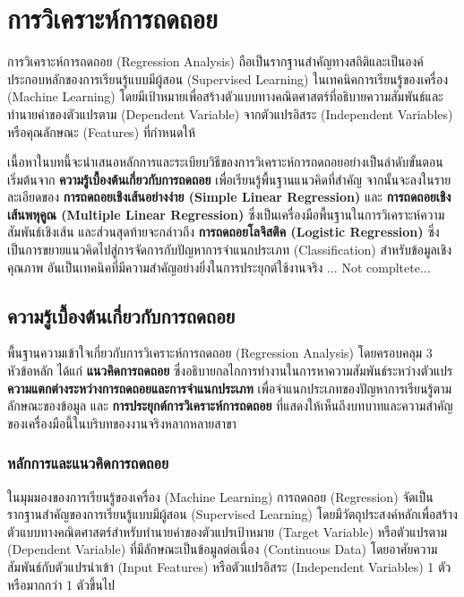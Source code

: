\chapter{การวิเคราะห์การถดถอย}

การวิเคราะห์การถดถอย (Regression Analysis) ถือเป็นรากฐานสำคัญทางสถิติและเป็นองค์ประกอบหลักของการเรียนรู้แบบมีผู้สอน (Supervised Learning) ในเทคนิคการเรียนรู้ของเครื่อง (Machine Learning) โดยมีเป้าหมายเพื่อสร้างตัวแบบทางคณิตศาสตร์ที่อธิบายความสัมพันธ์และทำนายค่าของตัวแปรตาม (Dependent Variable) จากตัวแปรอิสระ (Independent Variables) หรือคุณลักษณะ (Features) ที่กำหนดให้

เนื้อหาในบทนี้จะนำเสนอหลักการและระเบียบวิธีของการวิเคราะห์การถดถอยอย่างเป็นลำดับขั้นตอน เริ่มต้นจาก \textbf{ความรู้เบื้องต้นเกี่ยวกับการถดถอย} เพื่อเรียนรู้พื้นฐานแนวคิดที่สำคัญ จากนั้นจะลงในรายละเอียดของ \textbf{การถดถอยเชิงเส้นอย่างง่าย (Simple Linear Regression)} และ \textbf{การถดถอยเชิงเส้นพหุคูณ (Multiple Linear Regression)} ซึ่งเป็นเครื่องมือพื้นฐานในการวิเคราะห์ความสัมพันธ์เชิงเส้น และส่วนสุดท้ายจะกล่าวถึง \textbf{การถดถอยโลจิสติค (Logistic Regression)} ซึ่งเป็นการขยายแนวคิดไปสู่การจัดการกับปัญหาการจำแนกประเภท (Classification) สำหรับข้อมูลเชิงคุณภาพ อันเป็นเทคนิคที่มีความสำคัญอย่างยิ่งในการประยุกต์ใช้งานจริง ... Not compltete...

\section{ความรู้เบื้องต้นเกี่ยวกับการถดถอย}

พื้นฐานความเข้าใจเกี่ยวกับการวิเคราะห์การถดถอย (Regression Analysis) โดยครอบคลุม 3 หัวข้อหลัก ได้แก่ \textbf{แนวคิดการถดถอย} ซึ่งอธิบายกลไกการทำงานในการหาความสัมพันธ์ระหว่างตัวแปร \textbf{ความแตกต่างระหว่างการถดถอยและการจำแนกประเภท} เพื่อจำแนกประเภทของปัญหาการเรียนรู้ตามลักษณะของข้อมูล และ \textbf{การประยุกต์การวิเคราะห์การถดถอย} ที่แสดงให้เห็นถึงบทบาทและความสำคัญของเครื่องมือนี้ในบริบทของงานจริงหลากหลายสาขา

\subsection{หลักการและแนวคิดการถดถอย}

ในมุมมองของการเรียนรู้ของเครื่อง (Machine Learning) การถดถอย (Regression) จัดเป็นรากฐานสำคัญของการเรียนรู้แบบมีผู้สอน (Supervised Learning) โดยมีวัตถุประสงค์หลักเพื่อสร้างตัวแบบทางคณิตศาสตร์สำหรับทำนายค่าของตัวแปรเป้าหมาย (Target Variable) หรือตัวแปรตาม (Dependent Variable) ที่มีลักษณะเป็นข้อมูลต่อเนื่อง (Continuous Data) โดยอาศัยความสัมพันธ์กับตัวแปรนำเข้า (Input Features) หรือตัวแปรอิสระ (Independent Variables) 1 ตัวหรือมากกว่า 1 ตัวขึ้นไป

